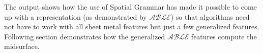 

%
%
% 
%
%
%
%
%

The output shows how the use of Spatial Grammar has made it possible to come up with a representation (as demonstrated by $\mathcal{ABLE}$) so that algorithms need not have to work with all sheet metal features but just a few generalized features.  Following section demonstrates how the generalized {\bf $\mathcal{ABLE}$} features compute the midsurface.


